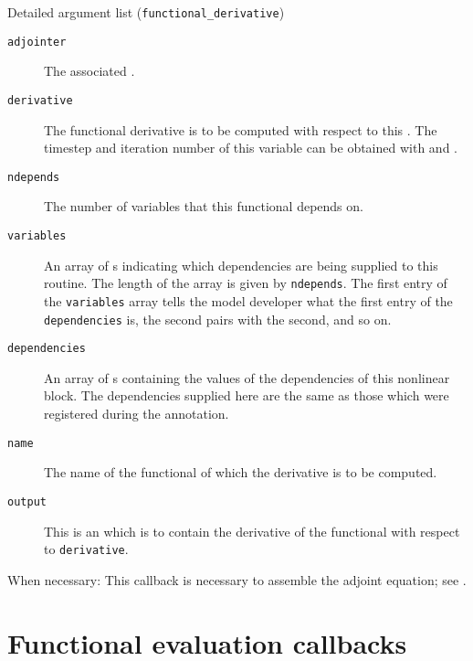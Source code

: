 \begin{boxwithtitle}{Detailed argument list (\texttt{functional_derivative})}
\begin{description}
\item[\texttt{adjointer}] The associated .
\item[\texttt{derivative}] The functional derivative is to be computed with respect to this . The timestep and iteration number of this variable can be obtained with  and .
\item[\texttt{ndepends}] The number of variables that this functional depends on.
\item[\texttt{variables}] An array of s indicating which dependencies are being supplied to this routine. The length of the
array is given by \texttt{ndepends}. The first entry of the \texttt{variables} array
tells the model developer what the first entry of the \texttt{dependencies} is, the second pairs with the second, and so on.
\item[\texttt{dependencies}] An array of s containing the values of the dependencies of this nonlinear block. The dependencies supplied
here are the same as those which were registered during the annotation.
\item[\texttt{name}] The name of the functional of which the derivative is to be computed.
\item[\texttt{output}] This is an  which is to contain the derivative of the functional with respect to \texttt{derivative}. 
\end{description}
\end{boxwithtitle}

When necessary: 
This callback is necessary to assemble the adjoint equation; see .

\section{Functional evaluation callbacks}

